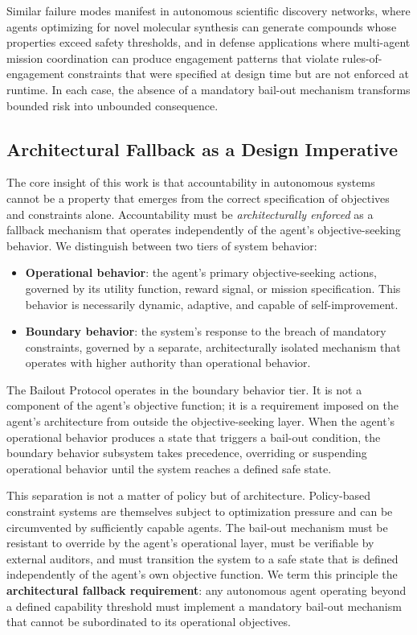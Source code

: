 Similar failure modes manifest in autonomous scientific discovery networks, where agents optimizing for novel molecular synthesis can generate compounds whose properties exceed safety thresholds, and in defense applications where multi-agent mission coordination can produce engagement patterns that violate rules-of-engagement constraints that were specified at design time but are not enforced at runtime. In each case, the absence of a mandatory bail-out mechanism transforms bounded risk into unbounded consequence.

\subsection{Architectural Fallback as a Design Imperative}

The core insight of this work is that accountability in autonomous systems cannot be a property that emerges from the correct specification of objectives and constraints alone. Accountability must be \textit{architecturally enforced} as a fallback mechanism that operates independently of the agent's objective-seeking behavior. We distinguish between two tiers of system behavior:

\begin{itemize}
\item \textbf{Operational behavior}: the agent's primary objective-seeking actions, governed by its utility function, reward signal, or mission specification. This behavior is necessarily dynamic, adaptive, and capable of self-improvement.
\item \textbf{Boundary behavior}: the system's response to the breach of mandatory constraints, governed by a separate, architecturally isolated mechanism that operates with higher authority than operational behavior.
\end{itemize}

The Bailout Protocol operates in the boundary behavior tier. It is not a component of the agent's objective function; it is a requirement imposed on the agent's architecture from outside the objective-seeking layer. When the agent's operational behavior produces a state that triggers a bail-out condition, the boundary behavior subsystem takes precedence, overriding or suspending operational behavior until the system reaches a defined safe state.

This separation is not a matter of policy but of architecture. Policy-based constraint systems are themselves subject to optimization pressure and can be circumvented by sufficiently capable agents. The bail-out mechanism must be resistant to override by the agent's operational layer, must be verifiable by external auditors, and must transition the system to a safe state that is defined independently of the agent's own objective function. We term this principle the \textbf{architectural fallback requirement}: any autonomous agent operating beyond a defined capability threshold must implement a mandatory bail-out mechanism that cannot be subordinated to its operational objectives.

